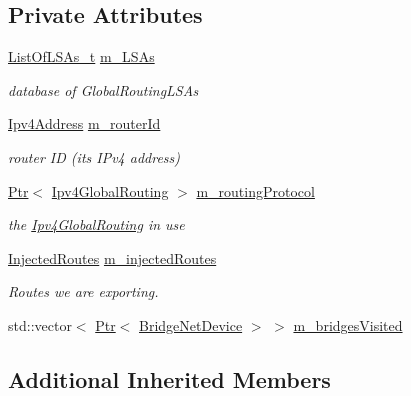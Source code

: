 \subsection*{Private Attributes}
\begin{DoxyCompactItemize}
\item 
\hyperlink{classns3_1_1GlobalRouter_a01ba626a41e2ac7d2f53bd9adab92556}{List\+Of\+L\+S\+As\+\_\+t} \hyperlink{classns3_1_1GlobalRouter_a5c583d84f810ce4404f54450a0ac18d4}{m\+\_\+\+L\+S\+As}
\begin{DoxyCompactList}\small\item\em database of Global\+Routing\+L\+S\+As \end{DoxyCompactList}\item 
\hyperlink{classns3_1_1Ipv4Address}{Ipv4\+Address} \hyperlink{classns3_1_1GlobalRouter_aa107123583f6b2b68c61666a029b4270}{m\+\_\+router\+Id}
\begin{DoxyCompactList}\small\item\em router ID (its I\+Pv4 address) \end{DoxyCompactList}\item 
\hyperlink{classns3_1_1Ptr}{Ptr}$<$ \hyperlink{classns3_1_1Ipv4GlobalRouting}{Ipv4\+Global\+Routing} $>$ \hyperlink{classns3_1_1GlobalRouter_a0a18bfb8e4f788c0e3027dcc603155a4}{m\+\_\+routing\+Protocol}
\begin{DoxyCompactList}\small\item\em the \hyperlink{classns3_1_1Ipv4GlobalRouting}{Ipv4\+Global\+Routing} in use \end{DoxyCompactList}\item 
\hyperlink{classns3_1_1GlobalRouter_a26119d19a18a0c540baffdc16f0a731f}{Injected\+Routes} \hyperlink{classns3_1_1GlobalRouter_a2d1dd8dbb1bc813f24bff2fb2f0cde7f}{m\+\_\+injected\+Routes}
\begin{DoxyCompactList}\small\item\em Routes we are exporting. \end{DoxyCompactList}\item 
std\+::vector$<$ \hyperlink{classns3_1_1Ptr}{Ptr}$<$ \hyperlink{classns3_1_1BridgeNetDevice}{Bridge\+Net\+Device} $>$ $>$ \hyperlink{classns3_1_1GlobalRouter_ad1b09bb4b76610b276fb065a0cb8dee6}{m\+\_\+bridges\+Visited}
\end{DoxyCompactItemize}
\subsection*{Additional Inherited Members}


